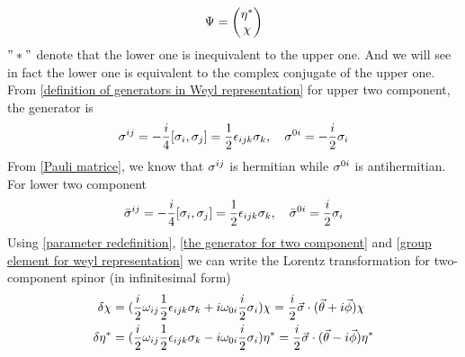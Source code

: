 \begin{equation}\label{decouple of Weyl representation}
  \Psi = \mqty(\admat{\h^* \\ \chi })
\end{equation}
$"*"$ denote that the lower one is inequivalent to the upper one. And we will see in fact the lower one is equivalent to the complex conjugate of the upper one.
From \eqref{definition of generators in Weyl representation} for upper two component, the generator is
\begin{equation} \label{the generator for  two component}
\s^{ij} = -\frac{i}{4}\comm{\s_{i}}{\s_{j}} = \half\e_{ijk} \s_k ,\quad
\s^{0i} = -\frac{i}{2}\s_{i}
\end{equation}
From \eqref{Pauli matrice}, we know that $\sigma^{ij}$ is hermitian while $\sigma^{0i}$ is antihermitian. For lower two component
\begin{equation}
  \bar{\s}^{ij} = -\frac{i}{4}\comm{\s_{i}}{\s_{j}} = \half\e_{ijk} \s_k ,\quad
  \bar{\s}^{0i} = \frac{i}{2}\s_{i}
\end{equation}
Using  \eqref{parameter redefinition}, \eqref{the generator for  two component} and \eqref{group element for weyl representation}
we can write the Lorentz transformation for two-component spinor (in infinitesimal form)
\begin{align}\label{infinitesimal transformation for two component spinor}
\delta\chi &= (\frac{i}{2} \omega_{ij}\frac{1}{2}\epsilon_{ijk}\sigma_k
       +i \omega_{0i}\frac{i}{2}\sigma_{i})\chi
     = \frac{i}{2}\vec{\sigma}\cdot(\vec{\theta}+i\vec{\phi})\chi\\
\delta\eta^* &= (\frac{i}{2} \omega_{ij}\frac{1}{2}\epsilon_{ijk}\sigma_k
-i \omega_{0i}\frac{i}{2}\sigma_{i})\eta^*
= \frac{i}{2}\vec{\sigma}\cdot(\vec{\theta}-i\vec{\phi})\eta^*
\end{align}

